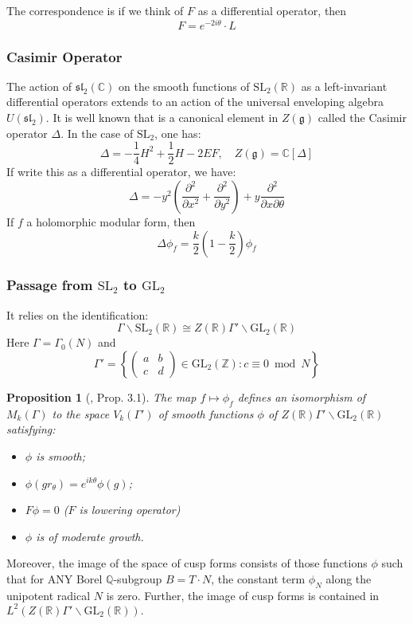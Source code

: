 \documentclass[11pt,english]{smfart}
\newtheorem{proposition}{Proposition}[section]
\theoremstyle{definition}
\theoremstyle{remark}
\begin{document}
The correspondence is if we think of $F$ as a differential operator, then
\[ F = e^{-2i\theta} \cdot L\]
\subsubsection{Casimir Operator}
The action of $\mathfrak{sl}_2(\mathbb{C})$ on the smooth functions of $\mathrm{SL}_2(\mathbb{R})$ as a left-invariant differential operators extends to an action of the universal enveloping algebra $U(\mathfrak{sl}_2)$. It is well known that is a canonical element in $Z(\mathfrak{g})$ called the Casimir operator $\Delta$. In the
case of $\mathrm{SL}_2$, one has:
\[\Delta = -\frac{1}{4} H^2 +\frac{1}{2}H -2EF,\quad Z(\mathfrak{g})=\mathbb{C}[\Delta]\]
If write this as a differential operator, we have:
\[\Delta =-y^2(\frac{\partial ^2}{\partial x^2}+\frac{\partial ^2}{\partial y^2})+y\frac{\partial ^2}{\partial x\partial \theta}\]
If $f$ a holomorphic modular form, then
\[\Delta \phi _f =\frac{k}{2}(1-\frac{k}{2}) \phi _f\]
\subsubsection{Passage from $\mathrm{SL_2}$ to $\mathrm{GL_2}$}
It relies on the identification:
\[\Gamma \backslash \mathrm{SL_2}(\mathbb{R}) \cong Z(\mathbb{R}) \Gamma ' \backslash \mathrm{GL_2}(\mathbb{R})\]
Here $\Gamma=\Gamma_0(N)$ and
\[\Gamma'=\left\{\left(\begin{array}{ll}a & b \\ c & d\end{array}\right) \in \mathrm{GL}_{2}(\mathbb{Z}): c \equiv 0 \bmod N\right\}\]
\begin{proposition}[\cite{Gel75}, Prop. 3.1]
    The map $ f \mapsto \phi_{f} $ defines an isomorphism of $ M_{k}(\Gamma) $ to the space $V_k(\Gamma ')$ of smooth functions $ \phi $ of $ Z(\mathbb{R}) \Gamma ' \backslash \mathrm{GL_2}(\mathbb{R}) $ satisfying:
    \begin{itemize}
        \item $\phi $ is smooth;
        \item $\phi\left(g r_{\theta}\right)=e^{i k \theta} \phi(g) $;
        \item $F \phi=0 $ ($ F $ is lowering operator)
        \item $\phi $ is of moderate growth.
    \end{itemize}
\end{proposition}
Moreover, the image of the space of cusp forms consists of those functions $ \phi $ such that for ANY Borel $\mathbb{Q}$-subgroup $ B=T \cdot N $, the constant term $ \phi_{N} $ along the unipotent radical $ N $ is zero. Further, the image of cusp forms is contained in $ L^{2}\left(Z(\mathbb{R})\Gamma' \backslash \mathrm{GL}_{2}(\mathbb{R})\right). $
\end{document}
